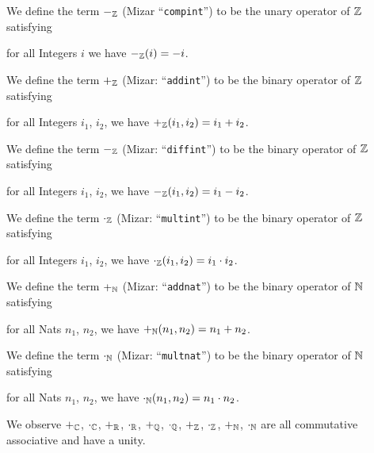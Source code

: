 \documentclass{article}
\begin{document}
\begin{definition}
We define the term $-_{\mathbb{Z}}$ (Mizar ``\verb#compint#'') to be the unary
operator of $\mathbb{Z}$ satisfying
\begin{defn}
\item for all Integers $i$ we have $-_{\mathbb{Z}}(i)=-i$.
\end{defn}
We define the term $+_{\mathbb{Z}}$ (Mizar: ``\verb#addint#'') to be the binary
operator of $\mathbb{Z}$ satisfying
\begin{defn}
\item for all Integers $i_{1}$, $i_{2}$, we have $+_{\mathbb{Z}}(i_{1},i_{2})=i_{1}+i_{2}$.
\end{defn}
We define the term $-_{\mathbb{Z}}$ (Mizar: ``\verb#diffint#'') to be the binary
operator of $\mathbb{Z}$ satisfying
\begin{defn}
\item for all Integers $i_{1}$, $i_{2}$, we have $-_{\mathbb{Z}}(i_{1},i_{2})=i_{1}-i_{2}$.
\end{defn}
We define the term $\cdot_{\mathbb{Z}}$ (Mizar: ``\verb#multint#'') to be the binary
operator of $\mathbb{Z}$ satisfying
\begin{defn}
\item for all Integers $i_{1}$, $i_{2}$, we have $\cdot_{\mathbb{Z}}(i_{1},i_{2})=i_{1}\cdot i_{2}$.
\end{defn}
\end{definition}

\begin{definition}
We define the term $+_{\mathbb{N}}$ (Mizar: ``\verb#addnat#'') to be the binary
operator of $\mathbb{N}$ satisfying
\begin{defn}
\item for all Nats $n_{1}$, $n_{2}$, we have $+_{\mathbb{N}}(n_{1},n_{2})=n_{1}+n_{2}$.
\end{defn}
We define the term $\cdot_{\mathbb{N}}$ (Mizar: ``\verb#multnat#'') to be the binary
operator of $\mathbb{N}$ satisfying
\begin{defn}
\item for all Nats $n_{1}$, $n_{2}$, we have $\cdot_{\mathbb{N}}(n_{1},n_{2})=n_{1}\cdot n_{2}$.
\end{defn}
\end{definition}

We observe $+_{\mathbb{C}}$, $\cdot_{\mathbb{C}}$, $+_{\mathbb{R}}$, $\cdot_{\mathbb{R}}$, 
$+_{\mathbb{Q}}$, $\cdot_{\mathbb{Q}}$, $+_{\mathbb{Z}}$, $\cdot_{\mathbb{Z}}$, $+_{\mathbb{N}}$, $\cdot_{\mathbb{N}}$
are all commutative associative and have a unity.
\end{document}
